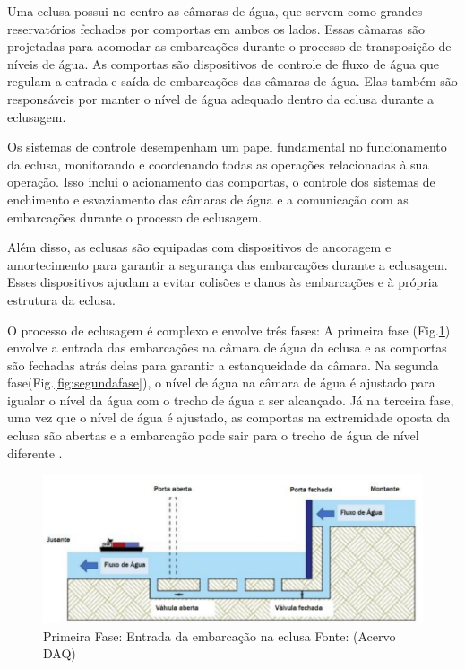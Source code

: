 Uma eclusa possui no centro as câmaras de água, que servem como grandes reservatórios fechados por comportas em ambos os lados. Essas câmaras são projetadas para acomodar as embarcações durante o processo de transposição de níveis de água. As comportas são dispositivos de controle de fluxo de água que regulam a entrada e saída de embarcações das câmaras de água. Elas também são responsáveis por manter o nível de água adequado dentro da eclusa durante a eclusagem.

Os sistemas de controle desempenham um papel fundamental no funcionamento da eclusa, monitorando e coordenando todas as operações relacionadas à sua operação. Isso inclui o acionamento das comportas, o controle dos sistemas de enchimento e esvaziamento das câmaras de água e a comunicação com as embarcações durante o processo de eclusagem.

Além disso, as eclusas são equipadas com dispositivos de ancoragem e amortecimento para garantir a segurança das embarcações durante a eclusagem. Esses dispositivos ajudam a evitar colisões e danos às embarcações e à própria estrutura da eclusa.

O processo de eclusagem é complexo e envolve três fases: A primeira fase (Fig.\ref{fig:primeirafase}) envolve a entrada das embarcações na câmara de água da eclusa e as comportas são fechadas atrás delas para garantir a estanqueidade da câmara. Na segunda fase(Fig.\ref{fig:segundafase}), o nível de água na câmara de água é ajustado para igualar o nível da água com o trecho de água a ser alcançado. Já na terceira fase, uma vez que o nível de água é ajustado, as comportas na extremidade oposta da eclusa são abertas e a embarcação pode sair para o trecho de água de nível diferente \cite{Eninfra}.


\begin{figure}[h]
	\centering
	\label{fig:primeirafase}
		\includegraphics[keepaspectratio=true,scale=0.6]{figuras/fase01.png}
	\caption{Primeira Fase: Entrada da embarcação na eclusa Fonte: (Acervo DAQ)}
\end{figure}

